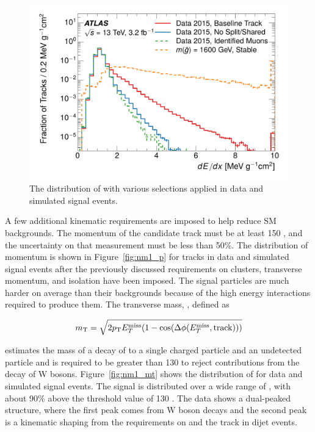 \begin{figure}[h]
\centering
\includegraphics[width=\fullfig]{figures/dedx_isolation.pdf}
\caption{The distribution of \dedx with various selections applied in data and simulated signal events.}
\label{fig:dedx_isolation}
\end{figure}

A few additional kinematic requirements are imposed to help reduce \ac{SM} backgrounds. 
The momentum of the candidate track must be at least 150 \GeV, and the uncertainty on that measurement must be less than 50\%. 
The distribution of momentum is shown in Figure~\ref{fig:nm1_p} for tracks in data and simulated signal events after the previously discussed requirements on clusters, transverse momentum, and isolation have been imposed.
The signal particles are much harder on average than their backgrounds because of the high energy interactions required to produce them.
The transverse mass, \mt, defined as 

\begin{equation}
 m_{\mathrm{T}} = \sqrt{2 p_{\mathrm{T}} E_T^{\mathrm{miss}} (1-\cos(\Delta\phi (E_T^{\mathrm{miss}},\mathrm{track})) ) }
\end{equation}

\noindent estimates the mass of a decay of to a single charged particle and an undetected particle and is required to be greater than 130 \GeV to reject contributions from the decay of W bosons.
Figure~\ref{fig:nm1_mt} shows the distribution of \mt for data and simulated signal events.
The signal is distributed over a wide range of \mt, with about 90\% above the threshold value of 130 \GeV. 
The data shows a dual-peaked structure, where the first peak comes from W boson decays and the second peak is a kinematic shaping from the requirements on \met and the track \pt in dijet events.


